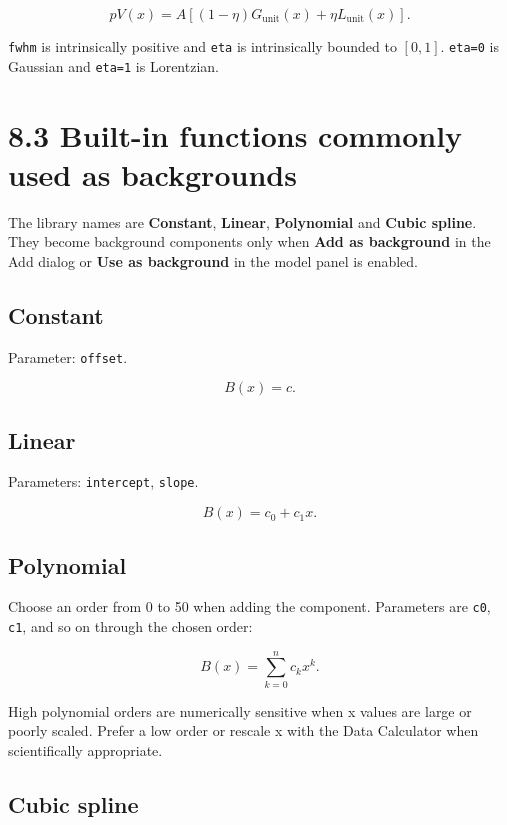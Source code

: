 \documentclass[
  10pt,
  a4paper,
  oneside]{scrreprt}
\begin{document}
\[
pV(x) = A[(1-\eta)G_{\mathrm{unit}}(x)+\eta L_{\mathrm{unit}}(x)].
\]

\texttt{fwhm} is intrinsically positive and \texttt{eta} is
intrinsically bounded to \([0,1]\). \texttt{eta=0} is Gaussian and
\texttt{eta=1} is Lorentzian.

\hypertarget{built-in-functions-commonly-used-as-backgrounds}{%
\section{8.3 Built-in functions commonly used as
backgrounds}\label{built-in-functions-commonly-used-as-backgrounds}}

The library names are \textbf{Constant}, \textbf{Linear},
\textbf{Polynomial} and \textbf{Cubic spline}. They become background
components only when \textbf{Add as background} in the Add dialog or
\textbf{Use as background} in the model panel is enabled.

\hypertarget{constant}{%
\subsection{Constant}\label{constant}}

Parameter: \texttt{offset}.

\[
B(x)=c.
\]

\hypertarget{linear}{%
\subsection{Linear}\label{linear}}

Parameters: \texttt{intercept}, \texttt{slope}.

\[
B(x)=c_0+c_1x.
\]

\hypertarget{polynomial}{%
\subsection{Polynomial}\label{polynomial}}

Choose an order from 0 to 50 when adding the component. Parameters are
\texttt{c0}, \texttt{c1}, and so on through the chosen order:

\[
B(x)=\sum_{k=0}^{n}c_kx^k.
\]

High polynomial orders are numerically sensitive when x values are large
or poorly scaled. Prefer a low order or rescale x with the Data
Calculator when scientifically appropriate.

\hypertarget{cubic-spline}{%
\subsection{Cubic spline}\label{cubic-spline}}
\end{document}
